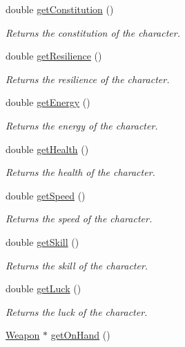 \begin{DoxyCompactItemize}
double \mbox{\hyperlink{class_character_a8220740f682216e2205a17a93da24da5}{get\+Constitution}} ()
\begin{DoxyCompactList}\small\item\em Returns the constitution of the character. \end{DoxyCompactList}\item 
double \mbox{\hyperlink{class_character_a2fa72a1a71a2009ce3f41addd17b3ee8}{get\+Resilience}} ()
\begin{DoxyCompactList}\small\item\em Returns the resilience of the character. \end{DoxyCompactList}\item 
double \mbox{\hyperlink{class_character_add3abc151041b4887ec4b1c0d7387067}{get\+Energy}} ()
\begin{DoxyCompactList}\small\item\em Returns the energy of the character. \end{DoxyCompactList}\item 
double \mbox{\hyperlink{class_character_a959689a61e590767de24d58c68d68eaa}{get\+Health}} ()
\begin{DoxyCompactList}\small\item\em Returns the health of the character. \end{DoxyCompactList}\item 
double \mbox{\hyperlink{class_character_a8e0bfcc02cbf60b5f466b4e8daa9ab8c}{get\+Speed}} ()
\begin{DoxyCompactList}\small\item\em Returns the speed of the character. \end{DoxyCompactList}\item 
double \mbox{\hyperlink{class_character_a646f45c59a8b2a5d48e7e83722ebeaa6}{get\+Skill}} ()
\begin{DoxyCompactList}\small\item\em Returns the skill of the character. \end{DoxyCompactList}\item 
double \mbox{\hyperlink{class_character_afe5886a4e21bf06cc44eef1f18e85ad6}{get\+Luck}} ()
\begin{DoxyCompactList}\small\item\em Returns the luck of the character. \end{DoxyCompactList}\item 
\mbox{\hyperlink{class_weapon}{Weapon}} $\ast$ \mbox{\hyperlink{class_character_a91d2c56e020fe4e0b9231fd2b3da2ef4}{get\+On\+Hand}} ()

\end{DoxyCompactItemize}
